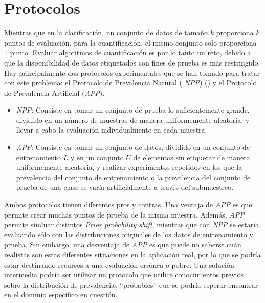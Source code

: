 \section{Protocolos}

Mientras que en la clasificación, un conjunto de datos de tamaño $k$ proporciona
$k$ puntos de evaluación, para la cuantificación, el mismo conjunto solo
proporciona $1$ punto. Evaluar algoritmos de cuantificación es por lo tanto un
reto, debido a que la disponibilidad de datos etiquetados con fines de prueba es
más restringido. Hay principalmente dos protocolos experimentales que se han
tomado para tratar con este problema: el Protocolo de Prevalencia Natural ({\it
NPP\/}) () y el Protocolo de Prevalencia Artificial ({\it APP\/}).

\begin{itemize}
    \item {\it NPP\/}: Consiste en tomar un conjunto de prueba lo
    suficientemente grande, dividirlo en un número de muestras de manera
    uniformemente aleatoria, y llevar a cabo la evaluación individualmente en
    cada muestra.
    \item {\it APP\/}: Consiste en tomar un conjunto de datos, dividido en un
    conjunto de entrenamiento $L$ y en un conjunto $U$ de elementos sin
    etiquetar de manera uniformemente aleatoria, y realizar experimentos
    repetidos en los que la prevalencia del conjunto de entrenamiento o la
    prevalencia del conjunto de prueba de una clase se varía artificialmente a
    través del submuestreo.
\end{itemize}

Ambos protocolos tienen diferentes pros y contras. Una ventaja de {\it APP\/} es
que permite crear muchas puntos de prueba de la misma muestra. Además, {\it
APP\/} permite simluar distintos {\it Prior probability shift}, mientras que con
{\it NPP\/} se estaría evaluando sólo con las distribuciones originales de los
datos de entrenamiento y prueba. Sin embargo, una desventaja de {\it APP\/} es
que puede no saberse cuán realistas son estas diferentes situaciones en la
aplicación real, por lo que se podría estar destinando recursos a una evaluación
errónea o pobre. Una solución intermedia podría ser utilizar un protocolo que
utilice conocimientos previos sobre la distribución de prevalencias “probables”
que se podría esperar encontrar en el dominio específico en cuestión.
